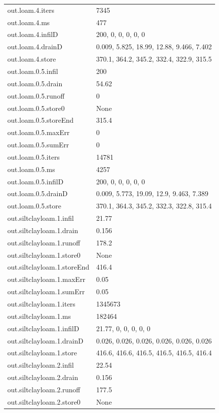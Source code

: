 {\begin{longtable}{p{}p{}}
{}out.loam.4.iters & 7345\\
{}out.loam.4.ms & 477\\
{}out.loam.4.infilD & 200, 0, 0, 0, 0, 0\\
{}out.loam.4.drainD & 0.009, 5.825, 18.99, 12.88, 9.466, 7.402\\
{}out.loam.4.store & 370.1, 364.2, 345.2, 332.4, 322.9, 315.5\\
{}out.loam.0.5.infil & 200\\
{}out.loam.0.5.drain & 54.62\\
{}out.loam.0.5.runoff & 0\\
{}out.loam.0.5.store0 & None\\
{}out.loam.0.5.storeEnd & 315.4\\
{}out.loam.0.5.maxErr & 0\\
{}out.loam.0.5.sumErr & 0\\
{}out.loam.0.5.iters & 14781\\
{}out.loam.0.5.ms & 4257\\
{}out.loam.0.5.infilD & 200, 0, 0, 0, 0, 0\\
{}out.loam.0.5.drainD & 0.009, 5.773, 19.09, 12.9, 9.463, 7.389\\
{}out.loam.0.5.store & 370.1, 364.3, 345.2, 332.3, 322.8, 315.4\\
{}out.siltclayloam.1.infil & 21.77\\
{}out.siltclayloam.1.drain & 0.156\\
{}out.siltclayloam.1.runoff & 178.2\\
{}out.siltclayloam.1.store0 & None\\
{}out.siltclayloam.1.storeEnd & 416.4\\
{}out.siltclayloam.1.maxErr & 0.05\\
{}out.siltclayloam.1.sumErr & 0.05\\
{}out.siltclayloam.1.iters & 1345673\\
{}out.siltclayloam.1.ms & 182464\\
{}out.siltclayloam.1.infilD & 21.77, 0, 0, 0, 0, 0\\
{}out.siltclayloam.1.drainD & 0.026, 0.026, 0.026, 0.026, 0.026, 0.026\\
{}out.siltclayloam.1.store & 416.6, 416.6, 416.5, 416.5, 416.5, 416.4\\
{}out.siltclayloam.2.infil & 22.54\\
{}out.siltclayloam.2.drain & 0.156\\
{}out.siltclayloam.2.runoff & 177.5\\
{}out.siltclayloam.2.store0 & None\\

\end{longtable}}
